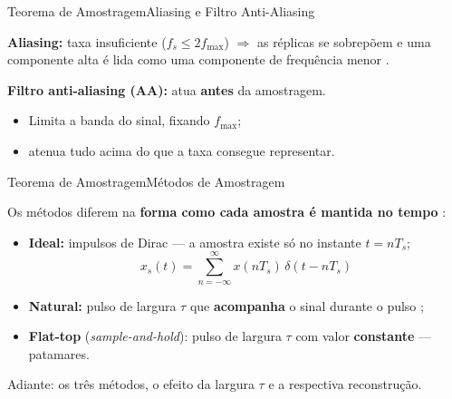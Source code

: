 
\begin{frame}{Teorema de Amostragem}{Aliasing e Filtro Anti-Aliasing}

	\textbf{Aliasing:} taxa insuficiente ($f_s\le2f_{\max}$) $\Rightarrow$ as
	réplicas se sobrepõem e uma componente alta é lida como uma componente
	de frequência menor \cite{oppenheim1997signals}.

	\vspace{0.8em}
	\textbf{Filtro anti-aliasing (AA):} atua \textbf{antes} da amostragem.
	\begin{itemize}
		\item Limita a banda do sinal, fixando $f_{\max}$;
		\item atenua tudo acima do que a taxa consegue representar.
	\end{itemize}

\end{frame}



\begin{frame}{Teorema de Amostragem}{Métodos de Amostragem}

	Os métodos diferem na \textbf{forma como cada amostra é mantida no tempo}
	\cite{oppenheim1997signals,lathi2012sistemas}:

	\vspace{0.6em}
	\begin{itemize}
		\item \textbf{Ideal:} impulsos de Dirac --- a amostra existe só no
		      instante $t=nT_s$;
		      \vspace{-0.3em}
		      \[
		      x_s(t)=\sum_{n=-\infty}^{\infty} x(nT_s)\,\delta(t-nT_s)
		      \]
		\item \textbf{Natural:} pulso de largura $\tau$ que \textbf{acompanha}
		      o sinal durante o pulso \cite{lathi2012sistemas};
		\item \textbf{Flat-top} (\textit{sample-and-hold}): pulso de largura
		      $\tau$ com valor \textbf{constante} --- patamares.
	\end{itemize}

	\vspace{0.8em}
	Adiante: os três métodos, o efeito da largura $\tau$ e a respectiva
	reconstrução.

\end{frame}
